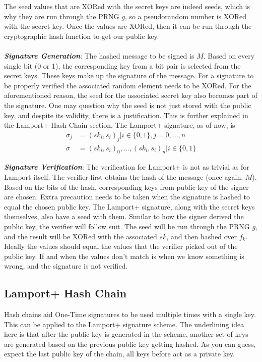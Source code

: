 \documentclass[]{scrartcl}
\makeatletter
\newcommand{\mathcenter}{\@fleqnfalse}
\makeatother
\begin{document}
The seed values that are XORed with the secret keys are indeed seeds, which is why they are run through the PRNG $g$, so a pseudorandom number is XORed with the secret key. Once the values are XORed, then it can be run through the cryptographic hash function to get our public key.\\ \\
\textbf{\textit{Signature Generation}}: The hashed message to be signed is $M$. Based on every single bit (0 or 1), the corresponding key from a bit pair is selected from the secret keys. These keys make up the signature of the message. For a signature to be properly verified the associated random element needs to be XORed. For the aforementioned reason, the seed for the associated secret key also becomes part of the signature. One may question why the seed is not just stored with the public key, and despite its validity, there is a justification. This is further explained in the Lamport+ Hash Chain section. The Lamport+ signature, as of now, is  
\mathcenter
\begin{equation}
\begin{split}
\sigma_j & = (sk_i, s_i)_j | i \in \{0, 1\}, j = 0,...,n \\
\sigma & = (sk_i, s_i)_0,...,(sk_i, s_i)_n | i \in \{0, 1\}
\end{split}
\end{equation}

\textbf{\textit{Signature Verification}}: The verification for Lamport+ is not as trivial as for Lamport itself. The verifier first obtains the hash of the message (once again, $M$). Based on the bits of the hash, corresponding keys from public key of the signer are chosen. Extra precaution needs to be taken when the signature is hashed to equal the chosen public key. The Lamport+ signature, along with the secret keys themselves, also have a seed with them. Similar to how the signer derived the public key, the verifier will follow suit. The seed will be run through the PRNG $g$, and the result will be XORed with the associated $sk$, and then hashed over $f_k$. Ideally the values should equal the values that the verifier picked out of the public key. If and when the values don't match is when we know something is wrong, and the signature is not verified.

\subsection*{Lamport+ Hash Chain}
Hash chains aid One-Time signatures to be used multiple times with a single key. This can be applied to the Lamport+ signature scheme. The underlining idea here is that after the public key is generated in the scheme, another set of keys are generated based on the previous public key getting hashed. As you can guess, expect the last public key of the chain, all keys before act as a private key.
\end{document}
